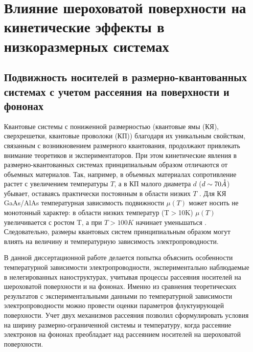 \chapter{Влияние шероховатой поверхности на кинетические эффекты в низкоразмерных системах} \label{chapt3}

\section{ Подвижность носителей в размерно-квантованных системах с учетом рассеяния на поверхности и фононах}

Квантовые системы с пониженной размерностью (квантовые ямы (КЯ), сверхрешетки, квантовые проволоки (КП)) благодаря их уникальным свойствам, связанным с возникновением размерного квантования, продолжают привлекать внимание теоретиков и экспериментаторов. При этом кинетические явления в размерно-квантованных системах принципиальным образом отличаются от объемных материалов. Так, например, в объемных материалах сопротивление растет с увеличением температуры $T$, а в КП малого диаметра $d$ ($d \sim 70 \AA$) убывает, оставаясь практически постоянным в области низких $T$ \cite{Lin2000,Lin2003,Heremans1998,Zhang2000,Heremans2000}. Для КЯ GaAs/AlAs температурная зависимость подвижности $\mu (T)$ может носить не монотонный характер: в области низких температур (T$>$10K) $\mu (T)$ увеличивается с ростом T, а при $T>100K$ начинает уменьшаться \cite{Lin2000,Sakaki1987}. Следовательно, размеры квантовых систем принципиальным образом могут влиять на величину и температурную зависимость электропроводности.

В данной диссертационной работе делается попытка объяснить особенности температурной зависимости электропроводности, экспериментально наблюдаемые в нелегированных наноструктурах, учитывая процессы рассеяния носителей на шероховатой поверхности и на фононах. Именно из сравнения теоретических результатов с экспериментальными данными по температурной зависимости электропроводности можно провести оценки параметров флуктуирующей поверхности. Учет двух механизмов рассеяния позволил сформулировать условия на ширину размерно-ограниченной системы и температуру, когда рассеяние электронов на фононах преобладает над рассеянием носителей на шероховатой поверхности.

